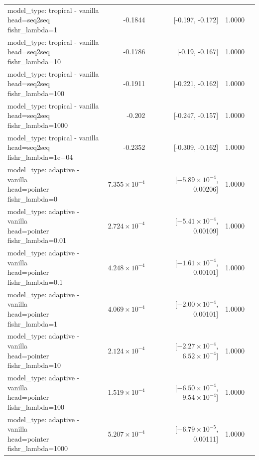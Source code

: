 \documentclass[10pt]{article}
\makeatletter
\newcommand{\stackcell}[1]{\begin{tabular}[t]{@{}l@{}}#1\end{tabular}}
\makeatother
\begin{document}
{\begin{longtable}{lrrrl}
\stackcell{model\_type: tropical - vanilla\\\footnotesize head=seq2seq fishr\_lambda=1 } & -0.1844 & [-0.197, -0.172] & 1.0000 & \\
\stackcell{model\_type: tropical - vanilla\\\footnotesize head=seq2seq fishr\_lambda=10 } & -0.1786 & [-0.19, -0.167] & 1.0000 & \\
\stackcell{model\_type: tropical - vanilla\\\footnotesize head=seq2seq fishr\_lambda=100 } & -0.1911 & [-0.221, -0.162] & 1.0000 & \\
\stackcell{model\_type: tropical - vanilla\\\footnotesize head=seq2seq fishr\_lambda=1000 } & -0.202 & [-0.247, -0.157] & 1.0000 & \\
\stackcell{model\_type: tropical - vanilla\\\footnotesize head=seq2seq fishr\_lambda=1e+04 } & -0.2352 & [-0.309, -0.162] & 1.0000 & \\
\stackcell{model\_type: adaptive - vanilla\\\footnotesize head=pointer fishr\_lambda=0 } & $7.355\times10^{-4}$ & [$-5.89\times10^{-4}$, 0.00206] & 1.0000 & \\
\stackcell{model\_type: adaptive - vanilla\\\footnotesize head=pointer fishr\_lambda=0.01 } & $2.724\times10^{-4}$ & [$-5.41\times10^{-4}$, 0.00109] & 1.0000 & \\
\stackcell{model\_type: adaptive - vanilla\\\footnotesize head=pointer fishr\_lambda=0.1 } & $4.248\times10^{-4}$ & [$-1.61\times10^{-4}$, 0.00101] & 1.0000 & \\
\stackcell{model\_type: adaptive - vanilla\\\footnotesize head=pointer fishr\_lambda=1 } & $4.069\times10^{-4}$ & [$-2.00\times10^{-4}$, 0.00101] & 1.0000 & \\
\stackcell{model\_type: adaptive - vanilla\\\footnotesize head=pointer fishr\_lambda=10 } & $2.124\times10^{-4}$ & [$-2.27\times10^{-4}$, $6.52\times10^{-4}$] & 1.0000 & \\
\stackcell{model\_type: adaptive - vanilla\\\footnotesize head=pointer fishr\_lambda=100 } & $1.519\times10^{-4}$ & [$-6.50\times10^{-4}$, $9.54\times10^{-4}$] & 1.0000 & \\
\stackcell{model\_type: adaptive - vanilla\\\footnotesize head=pointer fishr\_lambda=1000 } & $5.207\times10^{-4}$ & [$-6.79\times10^{-5}$, 0.00111] & 1.0000 & \\

\end{longtable}}
\end{document}
